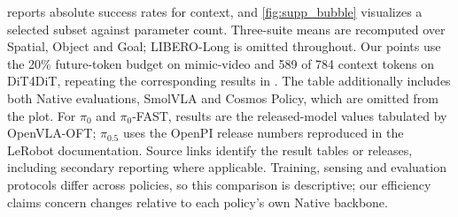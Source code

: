 reports absolute success rates for context, and \cref{fig:supp_bubble} visualizes a selected subset against parameter count.
Three-suite means are recomputed over Spatial, Object and Goal; LIBERO-Long is omitted throughout.
Our points use the 20\% future-token budget on mimic-video and 589 of 784 context tokens on DiT4DiT, repeating the corresponding results in .
The table additionally includes both Native evaluations, SmolVLA and Cosmos Policy, which are omitted from the plot.
For $\pi_0$ and $\pi_0$-FAST, results are the released-model values tabulated by OpenVLA-OFT; $\pi_{0.5}$ uses the OpenPI release numbers reproduced in the LeRobot documentation.
Source links identify the result tables or releases, including secondary reporting where applicable.
Training, sensing and evaluation protocols differ across policies, so this comparison is descriptive; our efficiency claims concern changes relative to each policy's own Native backbone.

